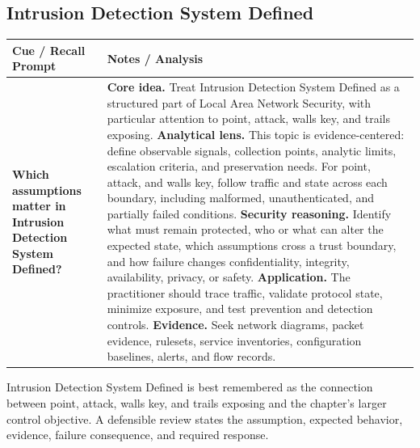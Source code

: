 \documentclass[11pt]{article}
\newcommand{\CornellHeader}{%
\rowcolor{Navy}\color{white}\bfseries Cue / Recall Prompt & \color{white}\bfseries Notes / Analysis\\\hline}
\newcommand{\CornellRow}[2]{%
\cellcolor{CueGray}\RaggedRight\textbf{#1} & \RaggedRight #2\\\hline}
\begin{document}
\subsection*{Intrusion Detection System Defined}
\begin{longtable}{>{\RaggedRight\arraybackslash}p{}|>{\RaggedRight\arraybackslash}p{}}
\CornellHeader
\CornellRow{Which assumptions matter in Intrusion Detection System Defined?}{\textbf{Core idea.} Treat Intrusion Detection System Defined as a structured part of Local Area Network Security, with particular attention to point, attack, walls key, and trails exposing. \textbf{Analytical lens.} This topic is evidence-centered: define observable signals, collection points, analytic limits, escalation criteria, and preservation needs. For point, attack, and walls key, follow traffic and state across each boundary, including malformed, unauthenticated, and partially failed conditions. \textbf{Security reasoning.} Identify what must remain protected, who or what can alter the expected state, which assumptions cross a trust boundary, and how failure changes confidentiality, integrity, availability, privacy, or safety. \textbf{Application.} The practitioner should trace traffic, validate protocol state, minimize exposure, and test prevention and detection controls. \textbf{Evidence.} Seek network diagrams, packet evidence, rulesets, service inventories, configuration baselines, alerts, and flow records.}
\end{longtable}
\begin{topicsummary}
Intrusion Detection System Defined is best remembered as the connection between point, attack, walls key, and trails exposing and the chapter's larger control objective. A defensible review states the assumption, expected behavior, evidence, failure consequence, and required response.
\end{topicsummary}
\end{document}
